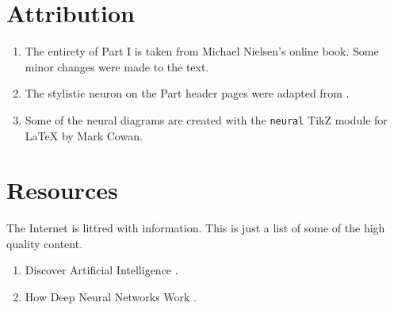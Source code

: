 \section*{Attribution}

\begin{enumerate}
\item 
The entirety of Part I is taken from Michael Nielsen's online book\cite{Nielsen2015}. Some minor changes were made to the text.

\item
The stylistic neuron on the Part header pages were adapted from \cite{Erler2004}. 

\item
Some of the neural diagrams  are created with the \lstinline{neural} TikZ module for \LaTeX{}\cite{cowan2019} by Mark Cowan.
\end{enumerate}

\section*{Resources}

The Internet is littred with information.  This is just a list of some of the high quality content.

\begin{enumerate}
\item Discover Artificial Intelligence \cite{AnkitGupta2019}.
\item How Deep Neural Networks Work  \cite{BrandonRohrer2019}.
\end{enumerate}